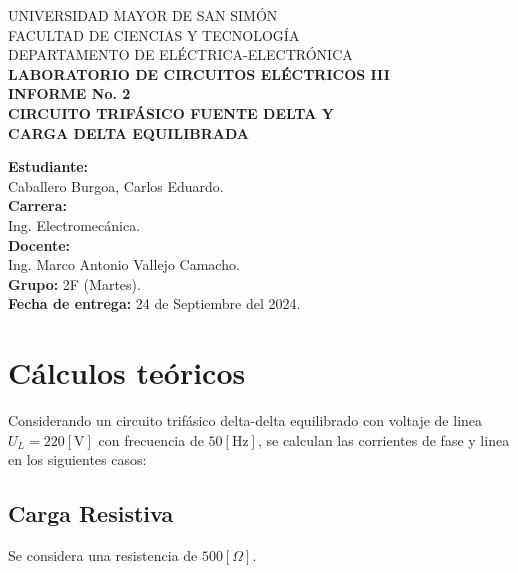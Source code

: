 \documentclass[letter,11pt]{article}
\begin{document}
\begin{titlepage}
    \begin{center}
        {\Large UNIVERSIDAD MAYOR DE SAN SIMÓN}\\
        \vspace*{0.15cm}
        {\large FACULTAD DE CIENCIAS Y TECNOLOGÍA}\\
        \vspace*{0.10cm}
        DEPARTAMENTO DE ELÉCTRICA-ELECTRÓNICA\\
        \vspace*{3.0cm}
        {\Large \textbf{LABORATORIO DE CIRCUITOS ELÉCTRICOS III}}\\
        \vspace*{0.3cm}
        {\Large \textbf{INFORME No. 2}}\\
        \vspace*{3.5cm}
        {\Large \textbf{CIRCUITO TRIFÁSICO FUENTE DELTA Y \\
        CARGA DELTA EQUILIBRADA}}\\
    \end{center}

    \vspace*{5.8cm}
    \leftskip=7.95cm
    \noindent
    \textbf{Estudiante:}\\
    Caballero Burgoa, Carlos Eduardo.\\
    \newline
    \textbf{Carrera:}\\
    Ing. Electromecánica.\\
    \newline
    \textbf{Docente:}\\
    Ing. Marco Antonio Vallejo Camacho.\\
    \newline
    \textbf{Grupo:} 2F (Martes).\\
\textbf{Fecha de entrega:} 24 de Septiembre del 2024.\\
\end{titlepage}

\section{Cálculos teóricos}
Considerando un circuito trifásico delta-delta equilibrado con voltaje de
linea $U_L=220[\text{V}]$ con frecuencia de $50[\text{Hz}]$, se calculan las
corrientes de fase y linea en los siguientes casos:

\subsection{Carga Resistiva}
Se considera una resistencia de $500[\Omega]$.
\end{document}

